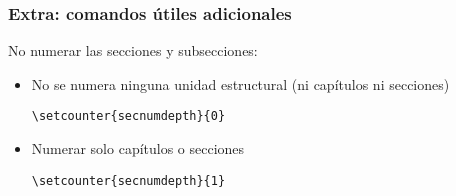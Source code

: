 \begin{frame}[fragile]
\frametitle{Extra: comandos útiles adicionales}
No numerar las secciones y subsecciones:
\begin{itemize}
    \item No se numera ninguna unidad estructural (ni capítulos ni secciones) 
    
    \hspace{0.2cm} \verb|\setcounter{secnumdepth}{0}|
    
    \item Numerar solo capítulos o secciones 
    
    \hspace{0.2cm} \verb|\setcounter{secnumdepth}{1}|
\end{itemize}

\end{frame}